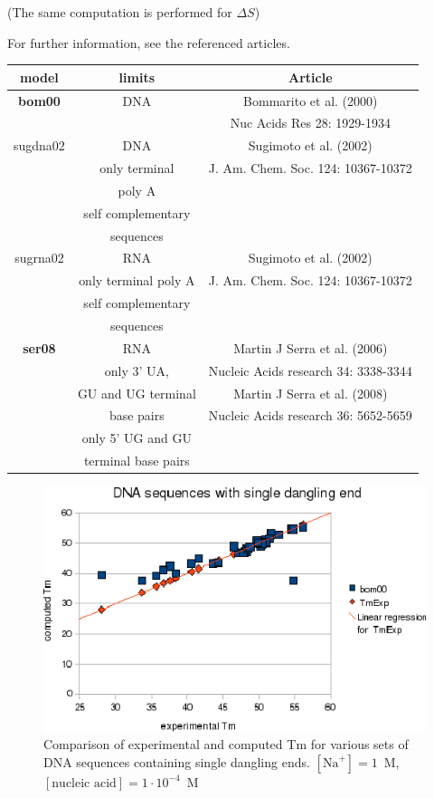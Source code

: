 \documentclass{article}
\begin{document}
       (The same computation is performed for $\Delta S$)

For further information, see the referenced articles.

\begin{table}[hc]
\begin{tabular}[h]{| c | c | c |}
\textbf{model} & \textbf{limits} & \textbf{Article} \\
\hline
\textbf{bom00} & DNA & Bommarito et al. (2000) \\
 & & Nuc Acids Res 28: 1929-1934 \\
\hline
sugdna02 & DNA & Sugimoto et al. (2002) \\
 & only terminal & J. Am. Chem. Soc. 124: 10367-10372 \\
 & poly A & \\
 & self complementary & \\
 & sequences & \\
 \hline
sugrna02 & RNA & Sugimoto et al. (2002) \\
 & only terminal poly A & J. Am. Chem. Soc. 124: 10367-10372 \\
 & self complementary & \\
 & sequences & \\
 \hline
\textbf{ser08} & RNA & Martin J Serra et al. (2006) \\
 & only 3' UA, & Nucleic Acids research 34: 3338-3344 \\
 & GU and UG terminal & Martin J Serra et al. (2008) \\
 & base pairs & Nucleic Acids research 36: 5652-5659 \\
 & only 5' UG and GU & \\
 & terminal base pairs & \\
 \hline
\end{tabular}
\end{table}

\begin{figure}[h]
\includegraphics[width=1\linewidth]{images/DNASingleDanglingEnd}
\caption{Comparison of experimental and computed Tm for various sets of
 DNA sequences containing single dangling ends. $[\mbox{Na}^+] = 1$~M, $[\mbox{nucleic acid}] = 1\cdot{}10^{-4}$~M}
\end{figure}
\end{document}
